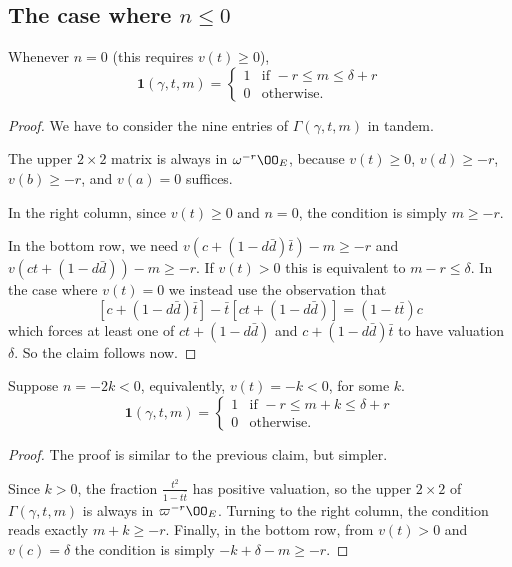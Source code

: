 \subsection{The case where $n \leq 0$}
\begin{claim}
  Whenever $n = 0$ (this requires $v(t) \geq 0$),
  \[
    \mathbf{1}(\gamma, t, m) =
    \begin{cases}
      1 & \text{if } -r \le m \le \delta+r \\
      0 & \text{otherwise.}
    \end{cases}
  \]
\end{claim}
\begin{proof}
  We have to consider the nine entries of $\Gamma(\gamma, t, m)$ in tandem.

  The upper $2 \times 2$ matrix is always in $\omega^{-r}\OO_E$,
  because $v(t) \geq 0$, $v(d) \geq -r$, $v(b) \geq -r$, and $v(a) = 0$ suffices.

  In the right column, since $v(t) \geq 0$ and $n = 0$, the condition is simply $m \ge -r$.

  In the bottom row, we need
  $v\left( c+(1-d\bar d) \bar t \right)-m \geq -r$
  and $v\left( ct +(1-d\bar d) \right)-m \geq -r$.
  If $v(t) > 0$ this is equivalent to $m-r \leq \delta$.
  In the case where $v(t) = 0$ we instead use the observation that
  \begin{equation}
    \left[ c + (1-d \bar d) \bar t \right]
    - \bar t \left[ ct + (1-d \bar d) \right] = (1-t\bar t) c
    \label{eq:ctrick}
  \end{equation}
  which forces at least one of $ct + (1-d \bar d)$ and $c + (1-d \bar d) \bar t$ to
  have valuation $\delta$. So the claim follows now.
\end{proof}

\begin{claim}
  Suppose $n = -2k < 0$, equivalently, $v(t) = -k < 0$, for some $k$.
  \[
    \mathbf{1}(\gamma, t, m) =
    \begin{cases}
      1 & \text{if } -r \le m+k \le \delta+r \\
      0 & \text{otherwise.}
    \end{cases}
  \]
\end{claim}
\begin{proof}
  The proof is similar to the previous claim, but simpler.

  Since $k > 0$, the fraction $\frac{t^2}{1-t \bar t}$ has positive valuation,
  so the upper $2 \times 2$ of $\Gamma(\gamma, t, m)$ is always in $\varpi^{-r}\OO_E$.
  Turning to the right column, the condition reads exactly $m+k \geq -r$.
  Finally, in the bottom row, from $v(t) > 0$ and $v(c) = \delta$
  the condition is simply $-k+\delta-m \geq -r$.
\end{proof}


